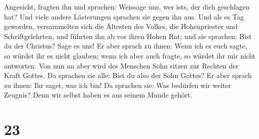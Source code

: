 Angesicht, fragten ihn und sprachen: Weissage uns, wer
ist\textquotesingle s, der dich geschlagen hat?  Und
viele andere Lästerungen sprachen sie gegen ihn aus.  Und
als es Tag geworden, versammelten sich die Ältesten des Volkes, die
Hohenpriester und Schriftgelehrten, und führten ihn ab vor ihren Hohen
Rat;  und sie sprachen: Bist du der Christus? Sage es
uns! Er aber sprach zu ihnen: Wenn ich es euch sagte, so würdet ihr es
nicht glauben;  wenn ich aber auch fragte, so würdet ihr
mir nicht antworten.  Von nun an aber wird des Menschen
Sohn sitzen zur Rechten der Kraft Gottes.  Da sprachen
sie alle: Bist du also der Sohn Gottes? Er aber sprach zu ihnen: Ihr
saget, was ich bin!  Da sprachen sie: Was bedürfen wir
weiter Zeugnis? Denn wir selbst haben es aus seinem Munde gehört.

\hypertarget{section-22}{%
\section{23}\label{section-22}}

